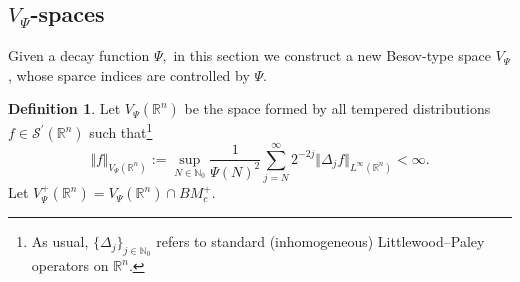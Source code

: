 \documentclass[11pt, a4paper,leqno]{amsart}
\theoremstyle{plain}
\numberwithin{equation}{section}
\theoremstyle{definition}
\newtheorem{definition}{Definition}
\theoremstyle{remark}
\def\R{\mathbb{R}}
\begin{document}
\subsection{$V_\Psi$-spaces} Given a decay function $\Psi,$ in this section we construct a new Besov-type
space $V_{\Psi}$, whose sparce indices are controlled by $\Psi.$

\begin{definition}\label{DefV}
Let $V_{\Psi}(\mathbb{R}^{n})$ be the space
formed by all tempered distributions $f\in\mathcal{S}^{\prime}(\mathbb{R}^{n})$ such that\footnote{As usual, $\{\Delta_j\}_{j \in \mathbb{N}_0}$ refers to  standard (inhomogeneous) Littlewood--Paley operators on $\R^n$. }
\[
\Vert f\Vert_{V_{\Psi}(\mathbb{R}^{n})}:=\sup_{N\in\mathbb{N}_{0}}\frac
{1}{\Psi(N)^{2}}\sum_{j=N}^{\infty}2^{-2j}\Vert\Delta_{j}f\Vert_{L^{\infty
}(\mathbb{R}^{n})} < \infty.
\]
Let
$
	V^+_\Psi(\R^n) = V_\Psi(\R^n) \cap BM^+_c.
$
\end{definition}
\end{document}
